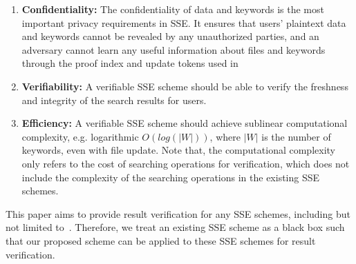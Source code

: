   \begin{enumerate}
    \item \textbf{Confidentiality:} The confidentiality of data and keywords is the most important privacy requirements in SSE. It ensures that users' plaintext data and keywords cannot be revealed by any unauthorized parties, and an adversary cannot learn any useful information about files and keywords through the proof index and update tokens used in %
    \item \textbf{Verifiability:} A verifiable SSE scheme should be able to verify the freshness and integrity of the search results for users.
    \item \textbf{Efficiency:} A verifiable SSE scheme should achieve sublinear computational complexity, e.g. logarithmic $O(log(|W|))$, where $|W|$ is the number of keywords, even with file update. Note that, the computational complexity only refers to the cost of searching operations for verification, which does not include the complexity of the searching operations in the existing SSE schemes.
  \end{enumerate}

  This paper aims to provide result verification for any SSE schemes, including but not limited to~\cite{stefanov2014practical,cash2014dynamic,kamara2012dynamic}. Therefore, we treat an existing SSE scheme as a black box such that our proposed scheme can be applied to these SSE schemes for result verification.
